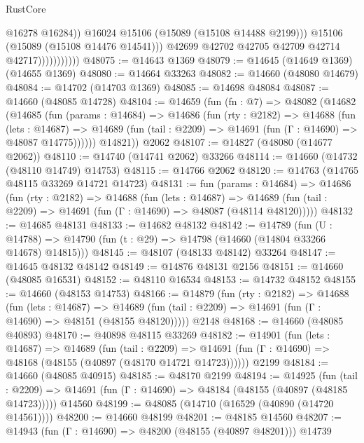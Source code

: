 \begin{lexlean}{RustCore}
\begin{coremodule}
                                  @16278
                                  @16284))
                              @16024
                              @15106
                              (@15089 (@15108 @14488 @2199)))
                            @15106
                            (@15089 (@15108 @14476 @14541)))
                          @42699
                          @42702
                          @42705
                          @42709
                          @42714
                          @42717)))))))))))
@48075 := @14643 @1369
@48079 := @14645 (@14649 @1369) (@14655 @1369)
@48080 := @14664 @33263
@48082 := @14660 (@48080 @14679)
@48084 := @14702 (@14703 @1369)
@48085 := @14698 @48084
@48087 := @14660 (@48085 @14728)
@48104 := @14659
    (fun (fn : @7) =>
    @48082
      (@14682
        (@14685
          (fun (params : @14684) =>
          @14686
            (fun (rty : @2182) =>
            @14688
              (fun (lets : @14687) =>
              @14689 (fun (tail : @2209) => @14691 (fun (Γ : @14690) => @48087 @14775))))))
        @14821))
    @2062
@48107 := @14827 (@48080 (@14677 @2062))
@48110 := @14740 (@14741 @2062) @33266
@48114 := @14660 (@14732 (@48110 @14749) @14753)
@48115 := @14766 @2062
@48120 := @14763 (@14765 @48115 @33269 @14721 @14723)
@48131 := fun (params : @14684) =>
  @14686
    (fun (rty : @2182) =>
    @14688
      (fun (lets : @14687) =>
      @14689 (fun (tail : @2209) => @14691 (fun (Γ : @14690) => @48087 (@48114 @48120)))))
@48132 := @14685 @48131
@48133 := @14682 @48132
@48142 := @14789
    (fun (U : @14788) => @14790 (fun (t : @29) => @14798 (@14660 (@14804 @33266 @14678) @14815)))
@48145 := @48107 (@48133 @48142) @33264
@48147 := @14645 @48132 @48142
@48149 := @14876 @48131 @2156
@48151 := @14660 (@48085 @16531)
@48152 := @48110 @16534
@48153 := @14732 @48152
@48155 := @14660 (@48153 @14753)
@48166 := @14879
    (fun (rty : @2182) =>
    @14688
      (fun (lets : @14687) =>
      @14689 (fun (tail : @2209) => @14691 (fun (Γ : @14690) => @48151 (@48155 @48120)))))
    @2148
@48168 := @14660 (@48085 @40893)
@48170 := @40898 @48115 @33269
@48182 := @14901
    (fun (lets : @14687) =>
    @14689
      (fun (tail : @2209) =>
      @14691 (fun (Γ : @14690) => @48168 (@48155 (@40897 (@48170 @14721 @14723))))))
    @2199
@48184 := @14660 (@48085 @40915)
@48185 := @48170 @2199
@48194 := @14925
    (fun (tail : @2209) => @14691 (fun (Γ : @14690) => @48184 (@48155 (@40897 (@48185 @14723)))))
    @14560
@48199 := @48085 (@14710 (@16529 (@40890 (@14720 @14561))))
@48200 := @14660 @48199
@48201 := @48185 @14560
@48207 := @14943 (fun (Γ : @14690) => @48200 (@48155 (@40897 @48201))) @14739

\end{coremodule}
\end{lexlean}
